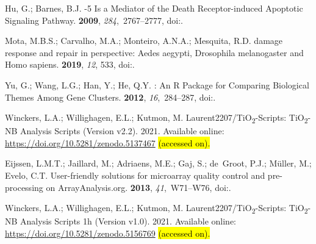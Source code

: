 \documentclass[ijms,article,accept,moreauthors,pdftex]{Definitions/mdpi}
\begin{document}
\begin{thebibliography}{999}
Hu, G.; Barnes, B.J.
-5 Is a Mediator of the Death Receptor-induced Apoptotic
  Signaling Pathway.
 {\bf 2009}, {\em
  284},~2767--2777,
\newblock
  doi:{\href{https://doi.org/10.1074/jbc.m804744200}{}}.

Mota, M.B.S.; Carvalho, M.A.; Monteiro, A.N.A.; Mesquita, R.D.
 damage response and repair in perspective: Aedes aegypti,
  Drosophila melanogaster and Homo sapiens.
 {\bf 2019}, {\em 12}, 533,
\newblock
  doi:{\href{https://doi.org/10.1186/s13071-019-3792-1}{}}.

Yu, G.; Wang, L.G.; Han, Y.; He, Q.Y.
: An R Package for Comparing Biological Themes Among
  Gene Clusters.
 {\bf 2012}, {\em
  16},~284--287,
\newblock
  doi:{\href{https://doi.org/10.1089/omi.2011.0118}{}}.

Winckers, L.A.; Willighagen, E.L.; Kutmon, M.
\newblock Laurent2207/TiO\textsubscript{2}-Scripts: TiO\textsubscript{2}-NB Analysis Scripts (Version v2.2). 2021.
\newblock Available online:  \url{https://doi.org/10.5281/zenodo.5137467} \hl{(accessed on). } %

Eijssen, L.M.T.; Jaillard, M.; Adriaens, M.E.; Gaj, S.; de~Groot, P.J.;
  M\"{u}ller, M.; Evelo, C.T.
\newblock User-friendly solutions for microarray quality control and
  pre-processing on {ArrayAnalysis}.org.
 {\bf 2013}, {\em 41},~W71--W76,
\newblock
  doi:{\href{https://doi.org/10.1093/nar/gkt293}{}}.

Winckers, L.A.; Willighagen, E.L.; Kutmon, M.
\newblock Laurent2207/TiO\textsubscript{2}-Scripts: TiO\textsubscript{2}-NB Analysis Scripts 1h (Version v1.0).  2021.
\newblock Available online: \url{https://doi.org/10.5281/zenodo.5156769} \hl{(accessed on). } %


\end{thebibliography}
\end{document}
